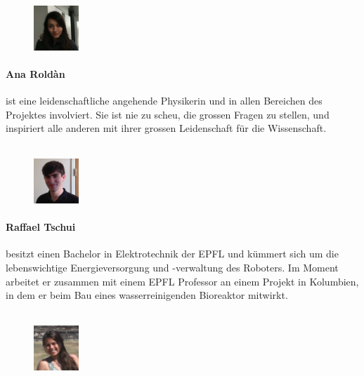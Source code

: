 \documentclass[a4paper,12pt]{article}
\begin{document}
\begin{figure}
    \centering
    \vspace{-13pt}
    \includegraphics[width=0.15\textwidth]{ana}
\end{figure}
\paragraph{Ana Roldàn} ist eine leidenschaftliche angehende Physikerin und in allen Bereichen des Projektes involviert. Sie ist nie zu scheu, die grossen Fragen zu stellen, und inspiriert alle anderen mit ihrer grossen Leidenschaft für die Wissenschaft.
\\ \\

\begin{figure}
     \centering
     \vspace{-13pt}
    \includegraphics[width=0.15\textwidth]{raf}
\end{figure} 
\paragraph{Raffael Tschui} besitzt einen Bachelor in Elektrotechnik der EPFL und kümmert sich um die lebenswichtige Energieversorgung und  -verwaltung des Roboters. Im Moment arbeitet er zusammen mit einem EPFL Professor an einem Projekt in Kolumbien, in dem er beim Bau eines wasserreinigenden Bioreaktor mitwirkt.  
\\ \\

\begin{figure}
    \centering
    \vspace{-13pt}
    \includegraphics[width=0.15\textwidth]{pam}
\end{figure} 
\end{document}
